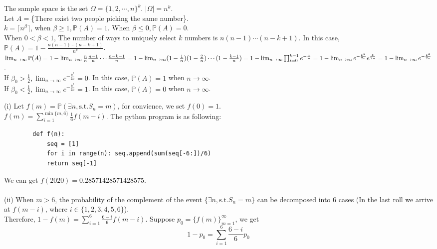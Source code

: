 \documentclass{homework}
\begin{document}
\question %
The sample space is the set $\Omega=\{1,2,\cdots,n\}^k$.  $\mid \Omega \mid = n^k$.\\
Let $A=$\{There exist two people picking the same number\}.\\
$k=\lceil n^\beta \rceil$, when $\beta \ge 1, \mathbb{P}(A)=1$. When $\beta \le 0, \mathbb{P}(A)=0$.\\
When $0<\beta<1$, The number of ways to uniquely select $k$ numbers is $n(n-1)\cdots(n-k+1)$. 
In this case, $\mathbb{P}(A)=1-\frac{n(n-1)\cdots(n-k+1)}{n^k}$.\\
$\lim_{n \to \infty}\mathbb{P}(A)=1-\lim_{n \to \infty}\frac{n}{n}\frac{n-1}{n}\cdots\frac{n-k-1}{n}
=1-\lim_{n \to \infty}(1-\frac{1}{n})(1-\frac{2}{n})\cdots(1-\frac{k-1}{n})
=1-\lim_{n \to \infty}\prod_{i=0}^{k-1}e^{-\frac{i}{n}}\\
=1-\lim_{n \to \infty}e^{-\frac{k^2}{2n}}e^{\frac{k}{2n}}=1-\lim_{n \to \infty}e^{-\frac{k^2}{2n}}$.\\
If $\beta_{0}>\frac{1}{2}, \lim_{n \to \infty}e^{-\frac{k^2}{2n}}=0$. In this case, $\mathbb{P}(A)=1$ when $n \to \infty$.\\ 
If $\beta_{0}<\frac{1}{2}, \lim_{n \to \infty}e^{-\frac{k^2}{2n}}=1$. In this case, $\mathbb{P}(A)=0$ when $n \to \infty$.

\question %
(i) Let $f(m)=\mathbb{P}(\exists n, \textrm{s.t.} S_{n}=m)$, for convience, we set $f(0)=1$.\\
$f(m)=\sum_{i=1}^{\min\{m,6\}}\frac{1}{6}f(m-i)$. 
The python program is as following:
    \begin{verbatim}
        def f(n):
            seq = [1]
            for i in range(n): seq.append(sum(seq[-6:])/6)
            return seq[-1]
    \end{verbatim}
We can get $f(2020)=0.28571428571428575$. \\       
\\
(ii) When $m>6$, the probability of the complement of the event $\{\exists n, \textrm{s.t.} S_{n}=m\}$ 
can be decomposed into 6 cases (In the last roll we arrive at $f(m-i)$, where $i \in \{1,2,3,4,5,6\}$).\\
Therefore, $1-f(m)=\sum_{i=1}^{6}\frac{6-i}{6}f(m-i)$. Suppose $p_{0}=\{f(m)\}_{m=1}^{\infty}$,
we get 
\begin{equation}
    1-p_{0}=\sum_{i=1}^{6}\frac{6-i}{6}p_{0}
\end{equation}
\end{document}
